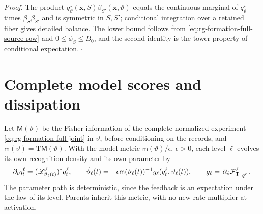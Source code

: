 \noindent\emph{Proof.}
The product \(q^\star_\vartheta(\mathbf x,S)\beta_{S'}(\mathbf x,\vartheta)\)
equals the continuous marginal of \(q^\star_\vartheta\) times
\(\beta_S\beta_{S'}\) and is symmetric in \(S,S'\); conditional integration
over a retained fiber gives detailed balance. The lower bound follows from
\cref{eq:rg-formation-full-source-row} and \(0\le\phi_S\le B_0\), and the
second identity is the tower property of conditional expectation. \(\square\)

\section{Complete model scores and dissipation}
\label{sec:rg-formation-learning}

Let \(\mathsf M(\vartheta)\) be the Fisher information of the complete
normalized experiment \cref{eq:rg-formation-full-joint} in \(\vartheta\),
before conditioning on the records, and \(\mathsf m(\vartheta)=
\mathrm T\mathsf M(\vartheta)\). With the model metric
\(\mathsf m(\vartheta)/\epsilon\), \(\epsilon>0\), each level \(\ell\) evolves
its own recognition density and its own parameter by
\begin{equation}
\partial_tq_t^\ell=(\mathscr L_{\vartheta_\ell(t)}^\ell)^*q_t^\ell,
\qquad
\dot\vartheta_\ell(t)
  =-\epsilon \mathsf m(\vartheta_\ell(t))^{-1}
        g_\ell(q_t^\ell,\vartheta_\ell(t)),
\qquad
g_\ell=\left.\partial_\vartheta\mathcal F_{\mathrm T}^\ell\right|_{q^\ell}.
\label{eq:rg-formation-own-law-dynamics}
\end{equation}
The parameter path is deterministic, since the feedback is an expectation
under the law of its level. Parents inherit this metric, with no new rate
multiplier at activation.

